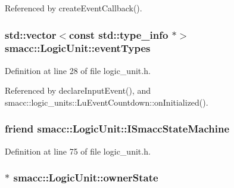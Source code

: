 Referenced by create\+Event\+Callback().

\subsubsection[{\texorpdfstring{event\+Types}{eventTypes}}]{\setlength{\rightskip}{0pt plus 5cm}std\+::vector$<$const std\+::type\+\_\+info $\ast$$>$ smacc\+::\+Logic\+Unit\+::event\+Types}\hypertarget{classsmacc_1_1LogicUnit_a6f02a49da9b408b54a2755c18c5616a8}{}\label{classsmacc_1_1LogicUnit_a6f02a49da9b408b54a2755c18c5616a8}


Definition at line 28 of file logic\+\_\+unit.\+h.



Referenced by declare\+Input\+Event(), and smacc\+::logic\+\_\+units\+::\+Lu\+Event\+Countdown\+::on\+Initialized().

\subsubsection[{\texorpdfstring{I\+Smacc\+State\+Machine}{ISmaccStateMachine}}]{\setlength{\rightskip}{0pt plus 5cm}friend smacc\+::\+Logic\+Unit\+::\+I\+Smacc\+State\+Machine\hspace{0.3cm}{\ttfamily [private]}}\hypertarget{classsmacc_1_1LogicUnit_a14bbdd3562913437e32ccd3ab0d8a0c7}{}\label{classsmacc_1_1LogicUnit_a14bbdd3562913437e32ccd3ab0d8a0c7}


Definition at line 75 of file logic\+\_\+unit.\+h.

\subsubsection[{\texorpdfstring{owner\+State}{ownerState}}]{$\ast$ smacc\+::\+Logic\+Unit\+::owner\+State}\hypertarget{classsmacc_1_1LogicUnit_a8863d227f46868876632b07b500f27d6}{}\label{classsmacc_1_1LogicUnit_a8863d227f46868876632b07b500f27d6}


